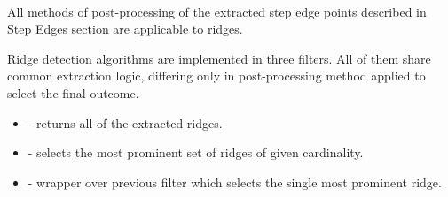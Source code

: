 \paragraph*{}
All methods of post-processing of the extracted step edge points described in Step Edges section are applicable to ridges. 

\begin{refImpl}
Ridge detection algorithms are implemented in three \studio filters. All of them share common extraction logic, differing only in post-processing method applied to select the final outcome.
\begin{itemize}
	\item {} - returns all of the extracted ridges.
	\item {} - selects the most prominent set of ridges of given cardinality.
	\item {} - wrapper over previous filter which selects the single most prominent ridge.
\end{itemize} 
\end{refImpl}

